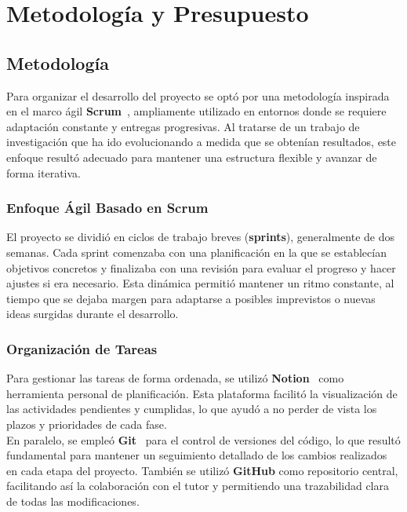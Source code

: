 
\chapter{Metodología y Presupuesto}\label{ch:metodologia-y-presupuesto}
\section{Metodología}\label{sec:metodologia}
Para organizar el desarrollo del proyecto se optó por una metodología inspirada en el marco ágil
\textbf{Scrum}~\cite{noauthor_scrum_nodate}, ampliamente utilizado en entornos donde se requiere adaptación constante y
entregas progresivas.
Al tratarse de un trabajo de investigación que ha ido evolucionando a medida que se obtenían resultados, este enfoque
resultó adecuado para mantener una estructura flexible y avanzar de forma iterativa.

\subsection{Enfoque Ágil Basado en Scrum}\label{subsec:enfoque-agil-basado-en-scrum}
El proyecto se dividió en ciclos de trabajo breves (\textbf{sprints}), generalmente de dos semanas.
Cada sprint comenzaba con una planificación en la que se establecían objetivos concretos y finalizaba con una revisión
para evaluar el progreso y hacer ajustes si era necesario.
Esta dinámica permitió mantener un ritmo constante, al tiempo que se dejaba margen para adaptarse a posibles
imprevistos o nuevas ideas surgidas durante el desarrollo.

\subsection{Organización de Tareas}\label{subsec:organizacion-de-tareas}
Para gestionar las tareas de forma ordenada, se utilizó \textbf{Notion}~\cite{noauthor_notion_nodate} como herramienta
personal de planificación.
Esta plataforma facilitó la visualización de las actividades pendientes y cumplidas, lo que ayudó a no perder de vista
los plazos y prioridades de cada fase. \\[6pt]

En paralelo, se empleó \textbf{Git}~\cite{chacon_pro_2014} para el control de versiones del código, lo que resultó
fundamental para mantener un seguimiento detallado de los cambios realizados en cada etapa del proyecto.
También se utilizó \textbf{GitHub} como repositorio central, facilitando así la colaboración con el tutor y permitiendo
una trazabilidad clara de todas las modificaciones. \\[6pt]


